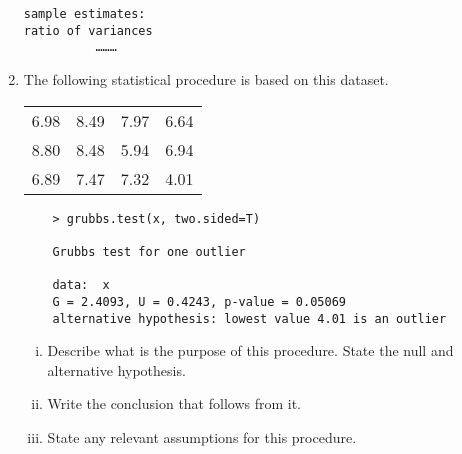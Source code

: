 \documentclass[a4paper,12pt]{article}
\begin{document}
\begin{enumerate}
\begin{framed}
\begin{verbatim}
sample estimates:
ratio of variances 
          ……… 
\end{verbatim}
\end{framed}


\item 
The following statistical procedure is based on this dataset.
\begin{center}
\begin{tabular}{|cccc|}
	\hline
	6.98 &8.49 &7.97& 6.64\\
	8.80 &8.48 &5.94& 6.94\\
	6.89 &7.47 &7.32& 4.01\\
	\hline
\end{tabular}
\end{center}

\begin{framed}

	\begin{verbatim}
	> grubbs.test(x, two.sided=T)
	
	Grubbs test for one outlier
	
	data:  x
	G = 2.4093, U = 0.4243, p-value = 0.05069
	alternative hypothesis: lowest value 4.01 is an outlier
	\end{verbatim}
\end{framed}

\begin{enumerate}[(i)]
	\item Describe what is the purpose of this procedure. State the null and alternative hypothesis.
	\item Write the conclusion that follows from it.
	\item State any relevant assumptions for this procedure.
\end{enumerate}

\end{enumerate}
\end{document}
